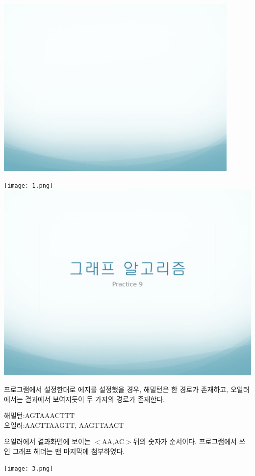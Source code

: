 \documentclass[12pt,a4paper]{article}
\begin{document}
\includegraphics[page=3, width=0.9\textwidth]{2.pdf}
\newpage

\texttt{[image: 1.png]}
\newpage
\includegraphics[page=4, width=\textwidth]{1.pdf}

프로그램에서 설정한대로 에지를 설정했을 경우, 해밀턴은 한 경로가 존재하고,
오일러에서는 결과에서 보여지듯이 두 가지의 경로가 존재한다.

해밀턴:AGTAAACTTT\\
오일러:AACTTAAGTT, AAGTTAACT

오일러에서 결과화면에 보이는 $<$AA,AC$>$뒤의 숫자가 순서이다.
프로그램에서 쓰인 그래프 헤더는 맨 마지막에 첨부하였다.

\texttt{[image: 3.png]}
\end{document}
